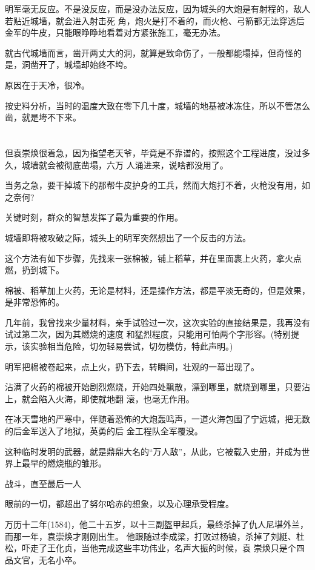 \documentclass[11pt,a4paper,onecolumn]{article}
\begin{document}
明军毫无反应。不是没反应，而是没办法反应，因为城头的大炮是有射程的，敌人若贴近城墙，就会进入射击死
角，炮火是打不着的，而火枪、弓箭都无法穿透后金军的牛皮，只能眼睁睁地看着对方紧张施工，毫无办法。

就古代城墙而言，凿开两丈大的洞，就算是致命伤了，一般都能塌掉，但奇怪的是，洞凿开了，城墙却始终不垮。

原因在于天冷，很冷。

按史料分析，当时的温度大致在零下几十度，城墙的地基被冰冻住，所以不管怎么凿，就是垮不下来。

\section[\thesection]{}

但袁崇焕很着急，因为指望老天爷，毕竟是不靠谱的，按照这个工程进度，没过多久，城墙就会被彻底凿塌，六万
人涌进来，说啥都没用了。

当务之急，要干掉城下的那帮牛皮护身的工兵，然而大炮打不着，火枪没有用，如之奈何?

关键时刻，群众的智慧发挥了最为重要的作用。

城墙即将被攻破之际，城头上的明军突然想出了一个反击的方法。

这个方法有如下步骤，先找来一张棉被，铺上稻草，并在里面裹上火药，拿火点燃，扔到城下。

棉被、稻草加上火药，无论是材料，还是操作方法，都是平淡无奇的，但是效果，是非常恐怖的。

几年前，我曾找来少量材料，亲手试验过一次，这次实验的直接结果是，我再没有试过第二次，因为其燃烧的速度
和猛烈程度，只能用可怕两个字形容。(特别提示，该实验相当危险，切勿轻易尝试，切勿模仿，特此声明。)

明军把棉被卷起来，点上火，扔下去，转瞬间，壮观的一幕出现了。

沾满了火药的棉被开始剧烈燃烧，开始四处飘散，漂到哪里，就烧到哪里，只要沾上，就会陷入火海，即使就地翻
滚，也毫无作用。

在冰天雪地的严寒中，伴随着恐怖的大炮轰鸣声，一道火海包围了宁远城，把无数的后金军送入了地狱，英勇的后
金工程队全军覆没。

这种临时发明的武器，就是鼎鼎大名的``万人敌''，从此，它被载入史册，并成为世界上最早的燃烧瓶的雏形。

战斗，直至最后一人

眼前的一切，都超出了努尔哈赤的想象，以及心理承受程度。

万历十二年(1584)，他二十五岁，以十三副盔甲起兵，最终杀掉了仇人尼堪外兰，而那一年，袁崇焕才刚刚出生。
他跟随过李成梁，打败过杨镐，杀掉了刘綎、杜松，吓走了王化贞，当他完成这些丰功伟业，名声大振的时候，袁
崇焕只是个四品文官，无名小卒。
\end{document}
